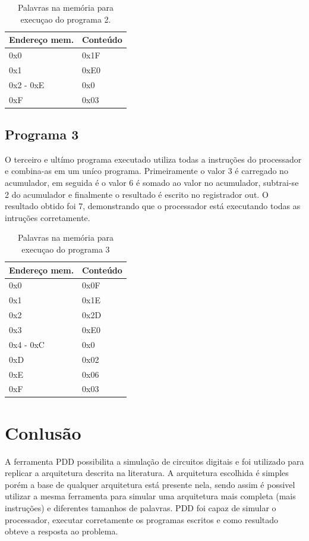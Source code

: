 \documentclass[11pt, twocolumn]{article}
\begin{document}
\begin{table}
  \caption{Palavras na memória para execuçao do programa 2.}
\begin{tabular}{ll}
  \hline
  Endereço mem. & Conteúdo \\
  \hline
  0x0 & 0x1F \\
  0x1 & 0xE0 \\
  0x2 - 0xE & 0x0 \\
  0xF & 0x03 \\
  \hline
  \end{tabular}
\label{tab-p2}
\end{table}

\subsection{Programa 3}
O terceiro e ultímo programa executado utiliza todas a instruções do processador e combina-as em um uníco programa.
Primeiramente o valor 3 é carregado no acumulador, em seguida é o valor 6 é somado ao valor no acumulador, subtrai-se 2 do acumulador e finalmente o resultado é escrito no registrador out.
O resultado obtido foi 7, demonstrando que o processador está executando todas as intruções corretamente.

\begin{table}
  \caption{Palavras na memória para execuçao do programa 3}
\begin{tabular}{ll}
  \hline
  Endereço mem. & Conteúdo \\
  \hline
  0x0 & 0x0F \\
  0x1 & 0x1E \\
  0x2 & 0x2D \\
  0x3 & 0xE0 \\
  0x4 - 0xC & 0x0 \\
  0xD & 0x02 \\
  0xE & 0x06 \\
  0xF & 0x03 \\
  \hline
  \end{tabular}
\end{table}
\label{tab-p3}


\section{Conlusão}

A ferramenta PDD possibilita a simulação de circuitos digitais e foi utilizado para replicar a arquitetura descrita na literatura.
A arquitetura escolhida é simples porém a base de qualquer arquitetura está presente nela, sendo assim é possivel utilizar a mesma ferramenta para simular uma arquitetura mais completa (mais instruções) e diferentes tamanhos de palavras.
PDD foi capaz de simular o processador, executar corretamente os programas escritos e como resultado obteve a resposta ao problema.
\end{document}
